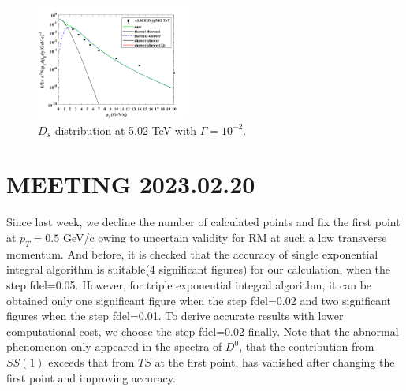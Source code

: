 \documentclass[twocolumn,aps,superscriptaddress,nofootinbib,floatfix]{revtex4}
\begin{document}
\begin{figure}[H]
	\includegraphics[width=0.45\textwidth]{Ds502_230213.png}
	\caption{$D_s$ distribution at 5.02 TeV with $\Gamma=10^{-2}$. }
	\label{fig51}
\end{figure}

\section{MEETING 2023.02.20}
Since last week, we decline the number of calculated points and fix the first point at $p_T=0.5$ GeV/c owing to uncertain validity for RM at such a low transverse momentum. And before, it is checked that the accuracy of single exponential integral algorithm is suitable(4 significant figures) for our calculation, when the step fdel=0.05. However, for triple exponential integral algorithm, it can be obtained only one significant figure when the step fdel=0.02 and two significant figures when the step fdel=0.01. To derive accurate results with lower computational cost, we choose the step fdel=0.02 finally. Note that the abnormal phenomenon only appeared in the spectra of $D^0$, that the contribution from $SS(1)$ exceeds that from $TS$ at the first point, has vanished after changing the first point and improving accuracy.
\end{document}

